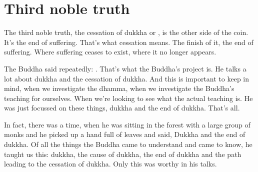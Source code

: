\documentclass[letterpaper,10pt,english]{sphinxmanual}
\begin{document}
\section{Third noble truth}
\label{\detokenize{6-b:third-noble-truth}}
\sphinxAtStartPar
The third noble truth, the cessation of dukkha or
, is the
other side of the coin. It’s the end of suffering. That’s what cessation means.
The finish of it, the end of suffering. Where suffering ceases to exist, where
it no longer appears.

\sphinxAtStartPar
The  Buddha  said  repeatedly:
. That’s what the Buddha’s project is. He
talks a lot about dukkha and the cessation of dukkha. And this is important
to keep in mind, when we investigate the dhamma, when we investigate the
Buddha’s teaching for ourselves. When we’re looking to see what the actual
teaching  is.  He  was  just  focussed  on  these  things,  dukkha  and  the  end  of
dukkha. That’s all.

\sphinxAtStartPar
In fact, there was a time, when he was sitting in the forest with a large
group of monks and he picked up a hand full of leaves and said,
Dukkha  and  the  end  of  dukkha.  Of  all  the  things  the  Buddha  came
to  understand  and  came  to  know,  he  taught  us  this:  dukkha,  the  cause  of
dukkha, the end of dukkha and the path leading to the cessation of dukkha.
Only this was worthy in his talks.
\end{document}
